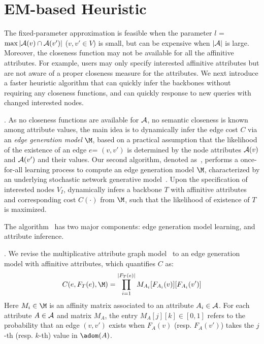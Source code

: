 
\vspace{-1ex}
\section{EM-based Heuristic}
\label{sec-em}

The fixed-parameter approximation is feasible when
the parameter
$l$ = $\max |\A(v)\cap\A(v')|$ ($v, v'\in V$) is small,
but can be expensive when $|\A|$ is large.
Moreover, the closeness function may not be available
for all the affinitive attributes. For example,
users may only specify interested affinitive attributes
but are not aware of a proper closeness measure for
the attributes. We next introduce
a faster heuristic algorithm that
can quickly infer the backbones without requiring
any closeness functions, and can quickly response
to new queries with changed interested nodes.

. As no closeness functions are available for $\A$,
\ie no semantic closeness is known among attribute values,
the main idea is to dynamically infer the edge cost $C$
via an {\em edge generation model} $\M$, based on a practical assumption
that the likelihood of the existence of an edge $e$= $(v,v')$
is determined by the node attributes $\A(v)$ and $\A(v')$
and their values.
Our second algorithm, denoted as~\heuabd, performs a
once-for-all learning process to
compute an edge generation model $\M$, characterized by
an underlying stochastic
network generative model~\cite{kim2011modeling}.
Upon the specification of interested nodes $V_I$,
\heuabd dynamically infers a backbone $T$
with affinitive attributes and corresponding cost
$C(\cdot)$ from $\M$, such that the likelihood
of existence of $T$ is maximized.

\vspace{.5ex}
The algorithm ~\heuabd has two major components:
edge generation model learning, and
attribute inference.

.
We revise the multiplicative attribute graph model~\cite{kim2011modeling}
to an edge generation model with affinitive attributes,
which quantifies $C$ as:
\[
C(e, F_T(e), \M) = \prod^{|F_T(e)|}_{i=1}M_{A_i}[F_{A_i}(v)][F_{A_i}(v')]
\]
Here $M_i\in \M$ is an affinity matrix
associated to an attribute $A_i\in \A$.
For each attribute $A\in \A$ and matrix $M_A$,
the entry $M_A[j][k]\in [0,1]$ refers
to the probability
that an edge $(v,v')$ exists when
$F_A(v)$ (resp. $F_A(v')$) takes the $j$-th (resp. $k$-th) value
in $\adom(A)$.

